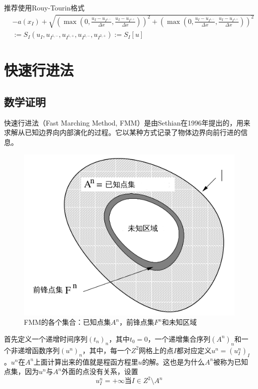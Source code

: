 推荐使用Rouy-Tourin格式
\begin{equation}
    \label{rouy-tourin-scheme}
    \begin{aligned}
    & -a(x_I) + \sqrt{(\max(0, \frac{u_I - u_{I^{1, -}}}{\Delta x}, \frac{u_I - u_{I^{1, +}}}{\Delta x}))^2 + (\max(0, \frac{u_I - u_{I^{1, -}}}{\Delta x}, \frac{u_I - u_{I^{1, +}}}{\Delta x}))^2} \\
    & := S_I(u_I, u_{I^{1, -}}, u_{I^{1, +}}, u_{I^{2, -}}, u_{I^{2, +}}) := S_I[u]
    \end{aligned}
\end{equation}

\section{快速行进法}
\subsection{数学证明}
快速行进法（Fast Marching Method, FMM）是由Sethian在1996年提出的，用来求解从已知边界向内部演化的过程。它以某种方式记录了物体边界向前行进的信息。
\begin{figure}[h!]
    \centering
    \includegraphics[width=300bp]{figure/sets_fmm.png}
    \caption{FMM的各个集合：已知点集$A^n$，前锋点集$F^n$和未知区域}
    \label{fig-sets_fmm}
\end{figure}

首先定义一个递增时间序列$(t_{n})_{n}$，其中$t_{0} = 0$，一个递增集合序列$(A^{n})_{n}$和一个非递增函数序列$(u^{n})_{n}$，其中，每一个$Z^{2}$网格上的点$I$都对应定义$u^{n} = (u^{n}_{I})_{I}$。$u^n$在$A^n$上面计算出来的值就是程函方程里$u$的解。这也是为什么$A^n$被称为已知点集，因为$u^n$与$A^n$外面的点没有关系，设置
\begin{equation*}
    \label{far_region}
    u^n_I = +\infty \mbox{当} I \in Z^2 \setminus A^n
\end{equation*}

